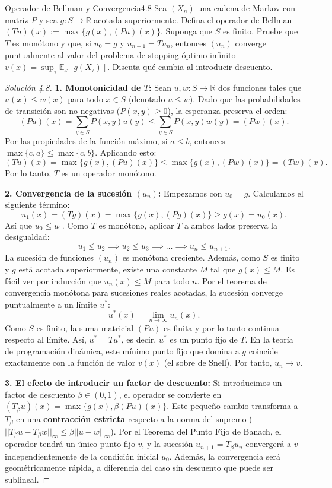 \documentclass[10pt,a4paper]{article}
\begin{document}
\begin{ejercicio}{Operador de Bellman y Convergencia}{4.8}
    Sea $(X_n)$ una cadena de Markov con matriz $P$ y sea $g: S \to \mathbb{R}$ acotada superiormente. Defina el operador de Bellman $(Tu)(x) := \max\{g(x), (Pu)(x)\}$.
    Suponga que $S$ es finito. Pruebe que $T$ es monótono y que, si $u_0 = g$ y $u_{n+1} = Tu_n$, entonces $(u_n)$ converge puntualmente al valor del problema de stopping óptimo infinito $v(x) = \sup_\tau \mathbb{E}_x[g(X_\tau)]$. Discuta qué cambia al introducir descuento.
\end{ejercicio}

\begin{proof}[Solución  4.8]
    \textbf{1. Monotonicidad de $T$:}
    Sean $u, w: S \to \mathbb{R}$ dos funciones tales que $u(x) \le w(x)$ para todo $x \in S$ (denotado $u \le w$).
    Dado que las probabilidades de transición son no negativas ($P(x,y) \ge 0$), la esperanza preserva el orden:
    \[ (Pu)(x) = \sum_{y \in S} P(x,y)u(y) \le \sum_{y \in S} P(x,y)w(y) = (Pw)(x). \]
    Por las propiedades de la función máximo, si $a \le b$, entonces $\max\{c, a\} \le \max\{c, b\}$. Aplicando esto:
    \[ (Tu)(x) = \max\{g(x), (Pu)(x)\} \le \max\{g(x), (Pw)(x)\} = (Tw)(x). \]
    Por lo tanto, $T$ es un operador monótono.

    \textbf{2. Convergencia de la sucesión $(u_n)$:}
    Empezamos con $u_0 = g$. Calculamos el siguiente término:
    \[ u_1(x) = (Tg)(x) = \max\{g(x), (Pg)(x)\} \ge g(x) = u_0(x). \]
    Así que $u_0 \le u_1$. Como $T$ es monótono, aplicar $T$ a ambos lados preserva la desigualdad:
    \[ u_1 \le u_2 \implies u_2 \le u_3 \implies \dots \implies u_n \le u_{n+1}. \]
    La sucesión de funciones $(u_n)$ es monótona creciente.
    Además, como $S$ es finito y $g$ está acotada superiormente, existe una constante $M$ tal que $g(x) \le M$. Es fácil ver por inducción que $u_n(x) \le M$ para todo $n$.
    Por el teorema de convergencia monótona para sucesiones reales acotadas, la sucesión converge puntualmente a un límite $u^*$:
    \[ u^*(x) = \lim_{n \to \infty} u_n(x). \]
    Como $S$ es finito, la suma matricial $(Pu)$ es finita y por lo tanto continua respecto al límite. Así, $u^* = Tu^*$, es decir, $u^*$ es un punto fijo de $T$. En la teoría de programación dinámica, este mínimo punto fijo que domina a $g$ coincide exactamente con la función de valor $v(x)$ (el sobre de Snell). Por tanto, $u_n \to v$.

    \textbf{3. El efecto de introducir un factor de descuento:}
    Si introducimos un factor de descuento $\beta \in (0,1)$, el operador se convierte en $(T_\beta u)(x) = \max\{g(x), \beta(Pu)(x)\}$.
    Este pequeño cambio transforma a $T_\beta$ en una \textbf{contracción estricta} respecto a la norma del supremo ($||T_\beta u - T_\beta w||_\infty \le \beta ||u - w||_\infty$).
    Por el Teorema del Punto Fijo de Banach, el operador tendrá un único punto fijo $v$, y la sucesión $u_{n+1} = T_\beta u_n$ convergerá a $v$ independientemente de la condición inicial $u_0$. Además, la convergencia será geométricamente rápida, a diferencia del caso sin descuento que puede ser sublineal.
\end{proof}
\end{document}

